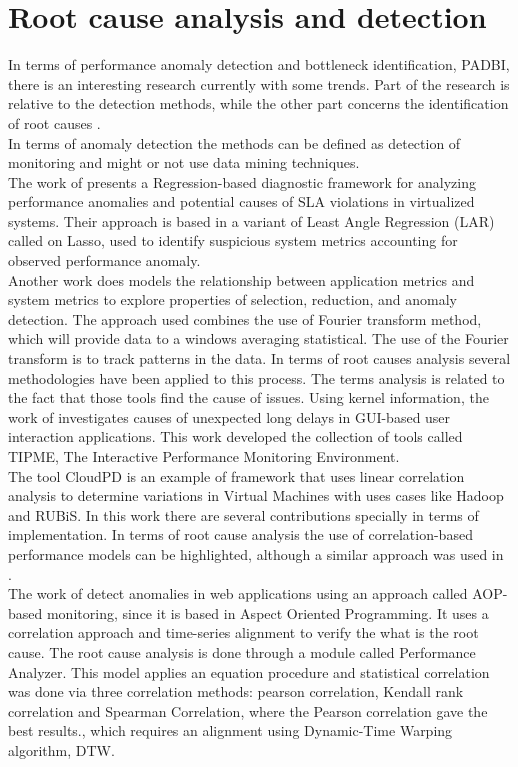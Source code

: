 \section{Root cause analysis and detection}
In terms of performance anomaly detection and bottleneck identification, PADBI, there is an interesting research currently with some trends. Part of the research is relative to the detection methods, while the other part concerns the identification of root causes \cite{Chandola2009ADS15418801541882}.\\
In terms of anomaly detection the methods can be defined as detection of monitoring and might or not use data mining techniques. \\
The work of \cite{lasso} presents a Regression-based diagnostic framework for analyzing performance anomalies and potential causes of SLA violations in virtualized systems. Their approach is based in a variant of Least Angle Regression (LAR) called on Lasso, used to identify suspicious system metrics accounting for observed performance anomaly.\\
Another work \cite{anomaly_detection_grid} does models the relationship between application metrics and system metrics to explore properties of selection, reduction, and anomaly detection. The approach used combines the use of Fourier transform method, which will provide data to a windows averaging statistical. The use of the Fourier transform is to track patterns in the data.
In terms of root causes analysis several methodologies have been applied to this process. The terms analysis is related to the fact that those tools find the cause of issues.
Using kernel information, the work of \cite{tipme} investigates causes of unexpected long delays in GUI-based user interaction applications. This work developed the collection of tools called TIPME, The Interactive Performance Monitoring Environment. \\
The tool CloudPD\cite{cloudPD} is an example of framework that uses linear correlation analysis to determine variations in Virtual Machines with uses cases like Hadoop and RUBiS. In this work there are several contributions specially in terms of implementation. In terms of root cause analysis the use of correlation-based performance models can be highlighted, although a similar approach was used in \cite{model_prob}.\\
The work of \cite{root_cause} detect anomalies in web applications using an approach called AOP-based monitoring, since it is based in Aspect Oriented Programming. It uses a correlation approach and time-series alignment to verify  the what is the root cause. The root cause analysis is done through a module called Performance Analyzer. This model applies an equation procedure and statistical correlation was done via three correlation methods: pearson correlation, Kendall rank correlation and Spearman Correlation, where the Pearson correlation gave the best results., which requires an alignment using Dynamic-Time Warping algorithm, DTW.\\
